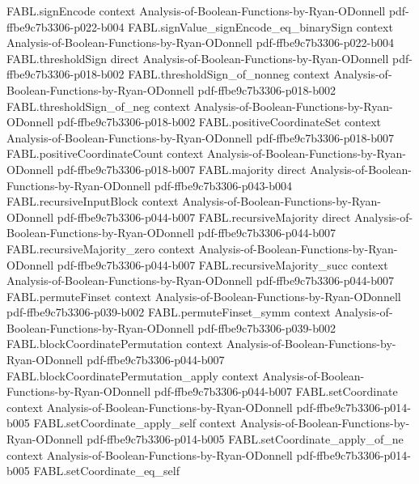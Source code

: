 \begin{theorem}
\proofstep
  {FABL.signEncode}
  {context}
  {Analysis-of-Boolean-Functions-by-Ryan-ODonnell}
  {pdf-ffbe9c7b3306-p022-b004}
\proofstep
  {FABL.signValue_signEncode_eq_binarySign}
  {context}
  {Analysis-of-Boolean-Functions-by-Ryan-ODonnell}
  {pdf-ffbe9c7b3306-p022-b004}
\proofstep
  {FABL.thresholdSign}
  {direct}
  {Analysis-of-Boolean-Functions-by-Ryan-ODonnell}
  {pdf-ffbe9c7b3306-p018-b002}
\proofstep
  {FABL.thresholdSign_of_nonneg}
  {context}
  {Analysis-of-Boolean-Functions-by-Ryan-ODonnell}
  {pdf-ffbe9c7b3306-p018-b002}
\proofstep
  {FABL.thresholdSign_of_neg}
  {context}
  {Analysis-of-Boolean-Functions-by-Ryan-ODonnell}
  {pdf-ffbe9c7b3306-p018-b002}
\proofstep
  {FABL.positiveCoordinateSet}
  {context}
  {Analysis-of-Boolean-Functions-by-Ryan-ODonnell}
  {pdf-ffbe9c7b3306-p018-b007}
\proofstep
  {FABL.positiveCoordinateCount}
  {context}
  {Analysis-of-Boolean-Functions-by-Ryan-ODonnell}
  {pdf-ffbe9c7b3306-p018-b007}
\proofstep
  {FABL.majority}
  {direct}
  {Analysis-of-Boolean-Functions-by-Ryan-ODonnell}
  {pdf-ffbe9c7b3306-p043-b004}
\proofstep
  {FABL.recursiveInputBlock}
  {context}
  {Analysis-of-Boolean-Functions-by-Ryan-ODonnell}
  {pdf-ffbe9c7b3306-p044-b007}
\proofstep
  {FABL.recursiveMajority}
  {direct}
  {Analysis-of-Boolean-Functions-by-Ryan-ODonnell}
  {pdf-ffbe9c7b3306-p044-b007}
\proofstep
  {FABL.recursiveMajority_zero}
  {context}
  {Analysis-of-Boolean-Functions-by-Ryan-ODonnell}
  {pdf-ffbe9c7b3306-p044-b007}
\proofstep
  {FABL.recursiveMajority_succ}
  {context}
  {Analysis-of-Boolean-Functions-by-Ryan-ODonnell}
  {pdf-ffbe9c7b3306-p044-b007}
\proofstep
  {FABL.permuteFinset}
  {context}
  {Analysis-of-Boolean-Functions-by-Ryan-ODonnell}
  {pdf-ffbe9c7b3306-p039-b002}
\proofstep
  {FABL.permuteFinset_symm}
  {context}
  {Analysis-of-Boolean-Functions-by-Ryan-ODonnell}
  {pdf-ffbe9c7b3306-p039-b002}
\proofstep
  {FABL.blockCoordinatePermutation}
  {context}
  {Analysis-of-Boolean-Functions-by-Ryan-ODonnell}
  {pdf-ffbe9c7b3306-p044-b007}
\proofstep
  {FABL.blockCoordinatePermutation_apply}
  {context}
  {Analysis-of-Boolean-Functions-by-Ryan-ODonnell}
  {pdf-ffbe9c7b3306-p044-b007}
\proofstep
  {FABL.setCoordinate}
  {context}
  {Analysis-of-Boolean-Functions-by-Ryan-ODonnell}
  {pdf-ffbe9c7b3306-p014-b005}
\proofstep
  {FABL.setCoordinate_apply_self}
  {context}
  {Analysis-of-Boolean-Functions-by-Ryan-ODonnell}
  {pdf-ffbe9c7b3306-p014-b005}
\proofstep
  {FABL.setCoordinate_apply_of_ne}
  {context}
  {Analysis-of-Boolean-Functions-by-Ryan-ODonnell}
  {pdf-ffbe9c7b3306-p014-b005}
\proofstep
  {FABL.setCoordinate_eq_self}

\end{theorem}
